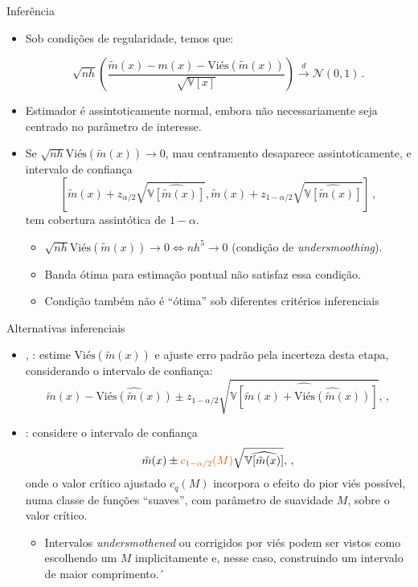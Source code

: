 \documentclass[11pt]{beamer}
\begin{document}
	\begin{frame}{Inferência}
	\begin{itemize}
		\item Sob condições de regularidade, temos que:
		
		$$\sqrt{nh}\left(\frac{\tilde{m}(x) - m(x)  - \text{Vi\'{e}s}(\tilde{m}(x)) }{\sqrt{\mathbb{V}[x]}}\right) \overset{d}{\to} \mathcal{N}(0,1) \, .$$
		\item Estimador é assintoticamente normal, embora não necessariamente seja centrado no parâmetro de interesse.
		\item Se $\sqrt{nh}\text{Vi\'{e}s}(\tilde{m}(x)) \to 0$, mau centramento desaparece assintoticamente, e intervalo de confiança $$[\tilde{m}(x) + z_{\alpha/2}\sqrt{\widehat{\mathbb{V}[\tilde{m}(x)]}}, \tilde{m}(x) + z_{1-\alpha/2}\sqrt{\widehat{\mathbb{V}[\tilde{m}(x)]}}]\,,$$ tem cobertura assintótica de $1-\alpha$.
		\begin{itemize}
			\item  $\sqrt{nh}\text{Vi\'{e}s}(\tilde{m}(x)) \to 0 \iff n h^5 \to 0$ (condição de \textit{undersmoothing}).
			\item Banda ótima para estimação pontual {\color{red}não} satisfaz essa condição.
			\item Condição também não é ``ótima'' sob diferentes critérios inferenciais \citep{armstrong2020simple,calonico2022coverage}
		\end{itemize}
	\end{itemize}
	\end{frame}
	\begin{frame}{Alternativas inferenciais}
	\begin{itemize}
		\item \citet{calonico2014robust}, \citet{calonico2018effect,calonico2022coverage}: estime $\text{Vi\'{e}s}(\tilde{m}(x))$ e ajuste erro padrão pela incerteza desta etapa, considerando o intervalo de confiança:
		 $$\tilde{m}(x) - \widehat{\text{Vi\'{e}s}(\tilde{m}(x))} \pm z_{1- \alpha/2}\sqrt{\widehat{\mathbb{V}[\tilde{m}(x) +\widehat{\text{Vi\'{e}s}(\tilde{m}(x))}]}},\,,$$
		 \item \citet{armstrong2020simple}: considere o intervalo de confiança
		 	 $$\tilde{m}(x) \pm {\color{red}c_{1- \alpha/2}(M)}\sqrt{\widehat{\mathbb{V}[\tilde{m}(x) ]}},\,,$$
		 	 onde o valor crítico ajustado $c_q(M)$ incorpora o efeito do pior viés possível, numa classe de funções ``suaves'', com parâmetro de suavidade $M$, sobre o valor crítico.
		 	 \begin{itemize}
		 	 	\item Intervalos \textit{undersmothened} ou corrigidos por viés podem ser vistos como escolhendo um $M$ implicitamente e, nesse caso, construindo um intervalo de maior comprimento.´
		 	 \end{itemize}
	\end{itemize}
	\end{frame}
	
\end{document}
